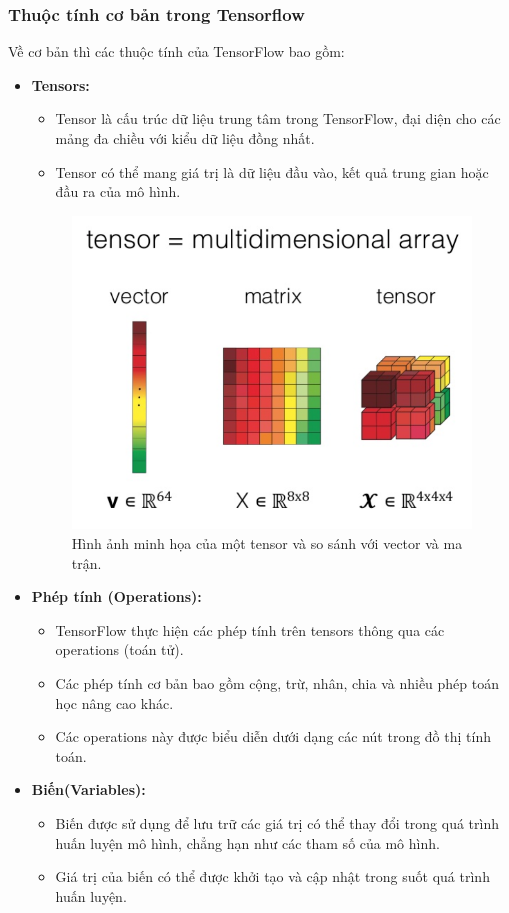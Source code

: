 \subsubsection{Thuộc tính cơ bản trong Tensorflow}
\indent Về cơ bản thì các thuộc tính của TensorFlow bao gồm:
\begin{itemize}
    \item \textbf{Tensors:} 
    \begin{itemize}
        \item Tensor là cấu trúc dữ liệu trung tâm trong TensorFlow, đại diện cho các mảng đa chiều với kiểu dữ liệu đồng nhất.
        \item Tensor có thể mang giá trị là dữ liệu đầu vào, kết quả trung gian hoặc đầu ra của mô hình.
    \end{itemize}
    \begin{figure}[H]
        \centering
        \includegraphics[width=\textwidth,height=\textheight,keepaspectratio]{Images/Theoretical basis/tensor.png}
        \caption{Hình ảnh minh họa của một tensor và so sánh với vector và ma trận.}
        \label{fig:enter-label}
    \end{figure}
    \item \textbf{Phép tính (Operations):} 
    \begin{itemize}
        \item TensorFlow thực hiện các phép tính trên tensors thông qua các operations (toán tử).
        \item Các phép tính cơ bản bao gồm cộng, trừ, nhân, chia và nhiều phép toán học nâng cao khác.
        \item Các operations này được biểu diễn dưới dạng các nút trong đồ thị tính toán.
    \end{itemize}
    \item \textbf{Biến(Variables):} 
    \begin{itemize}
        \item Biến được sử dụng để lưu trữ các giá trị có thể thay đổi trong quá trình huấn luyện mô hình, chẳng hạn như các tham số của mô hình.
        \item Giá trị của biến có thể được khởi tạo và cập nhật trong suốt quá trình huấn luyện.
    \end{itemize}


\end{itemize}
